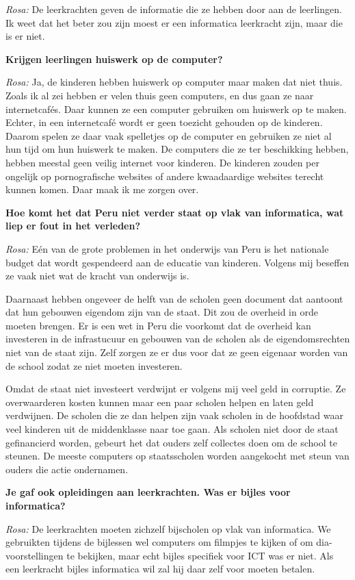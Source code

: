\textit{Rosa:} De leerkrachten geven de informatie die ze hebben door aan de leerlingen. Ik weet dat het beter zou zijn moest er een informatica leerkracht zijn, maar die is er niet.

\textbf{Krijgen leerlingen huiswerk op de computer?}

\textit{Rosa:} Ja, de kinderen hebben huiswerk op computer maar maken dat niet thuis. Zoals ik al zei hebben er velen thuis geen computers, en dus gaan ze naar internetcafés. Daar kunnen ze een computer gebruiken om huiswerk op te maken. Echter, in een internetcafé wordt er geen toezicht gehouden op de kinderen. Daarom spelen ze daar vaak spelletjes op de computer en gebruiken ze niet al hun tijd om hun huiswerk te maken. De computers die ze ter beschikking hebben, hebben meestal geen veilig internet voor kinderen. De kinderen zouden per ongelijk op pornografische websites of andere kwaadaardige websites terecht kunnen komen. Daar maak ik me zorgen over.

\textbf{Hoe komt het dat Peru niet verder staat op vlak van informatica, wat liep er fout in het verleden?}

\textit{Rosa:} Eén van de grote problemen in het onderwijs van Peru is het nationale budget dat wordt gespendeerd aan de educatie van kinderen. Volgens mij beseffen ze vaak niet wat de kracht van onderwijs is. 

Daarnaast hebben ongeveer de helft van de scholen geen document dat aantoont dat hun gebouwen eigendom zijn van de staat. Dit zou de overheid in orde moeten brengen. Er is een wet in Peru die voorkomt dat de overheid kan investeren in de infrastucuur en gebouwen van de scholen als de eigendomsrechten niet van de staat zijn. Zelf zorgen ze er dus voor dat ze geen eigenaar worden van de school zodat ze niet moeten investeren.

Omdat de staat niet investeert verdwijnt er volgens mij veel geld in corruptie. Ze overwaarderen kosten kunnen maar een paar scholen helpen en laten geld verdwijnen. De scholen die ze dan helpen zijn vaak scholen in de hoofdstad waar veel kinderen uit de middenklasse naar toe gaan. Als scholen niet door de staat gefinancierd worden, gebeurt het dat ouders zelf collectes doen om de school te steunen. De meeste computers op staatsscholen worden aangekocht met steun van ouders die actie ondernamen. 

\textbf{Je gaf ook opleidingen aan leerkrachten. Was er bijles voor informatica?}

\textit{Rosa:} De leerkrachten moeten zichzelf bijscholen op vlak van informatica. We gebruikten tijdens de bijlessen wel computers om filmpjes te kijken of om dia-voorstellingen te bekijken, maar echt bijles specifiek voor ICT was er niet. Als een leerkracht bijles informatica wil zal hij daar zelf voor moeten betalen.

